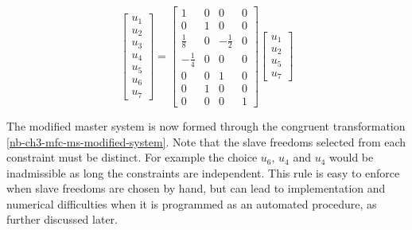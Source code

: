 \begin{equation}\label{nb-ch3-mfc-ms-multiple-freedoms}
    \begin{bmatrix}
        u_1 \\
        u_2 \\
        u_3 \\
        u_4 \\
        u_5 \\
        u_6 \\
        u_7
    \end{bmatrix}
    = \begin{bmatrix}
        1 & 0 & 0 & 0 \\
        0 & 1 & 0 & 0 \\
        \frac{1}{8} & 0 & -\frac{1}{2} & 0 \\
        -\frac{1}{4} & 0 & 0 & 0 \\
        0 & 0 & 1 & 0 \\
        0 & 1 & 0 & 0 \\
        0 & 0 & 0 & 1
    \end{bmatrix}
    \begin{bmatrix}
        u_1 \\
        u_2 \\
        u_5 \\
        u_7
    \end{bmatrix}
\end{equation}

The modified master system is now formed through the congruent
transformation \eqref{nb-ch3-mfc-ms-modified-system}.
Note that the slave freedoms selected from each
constraint must be distinct. For example the choice $ u_6 $, $ u_4 $ and $ u_4 $
would be inadmissible as long the constraints are independent. This rule is easy
to enforce when slave freedoms are chosen by hand, but can lead to implementation
and numerical difficulties when it is programmed as an automated procedure, as
further discussed later.

